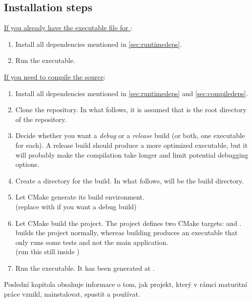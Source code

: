 \documentclass[11pt,a4paper,twoside,openright]{report}
\begin{document}
\subsection{Installation steps}
\underline{If you already have the executable file for \pname{}}:
\begin{enumerate}
	\item
		Install all dependencies mentioned in \ref{sec:runtimedeps}.
	\item
		Run the executable.
\end{enumerate}
\underline{If you need to compile the source}:
\begin{enumerate}
	\item
		Install all dependencies mentioned in \ref{sec:runtimedeps} and \ref{sec:compiledeps}.
	\item
		Clone the repository. In what follows, it is assumed that  is the root directory of the repository.
	\item
		Decide whether you want a \emph{debug} or a \emph{release} build (or both, one executable for each). A release build should produce a more optimized executable, but it will probably make the compilation take longer and limit potential debugging options.
	\item
		Create a directory for the build. In what follows,  will be the build directory.
	\item
		Let CMake generate its build environment.
		\\
		(replace  with  if you want a debug build)
	\item
		Let CMake build the project. The project defines two CMake targets:  and .  builds the project normally, whereas building  produces an executable that only runs some tests and not the main application.
		\\
		(run this still inside )
	\item
		Run the executable. It has been generated at .
\end{enumerate}

Poslední kapitola obsahuje informace o tom, jak projekt, který v rámci maturitní práce vznikl, nainstalovat, spustit a používat.
\end{document}
